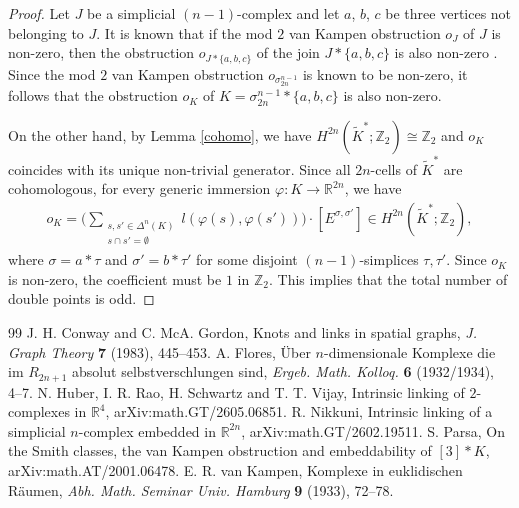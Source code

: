 \documentclass[10pt,a4paper]{amsart}
\numberwithin{equation}{section}
\begin{document}
\begin{proof}
Let $J$ be a simplicial $(n-1)$-complex and let $a$, $b$, $c$ be three vertices not belonging to $J$. It is known that if the mod $2$ van Kampen obstruction $o_J$ of $J$ is non-zero, then the obstruction $o_{J*\{a,b,c\}}$ of the join $J*\{a,b,c\}$ is also non-zero \cite{Pa20}. Since the mod $2$ van Kampen obstruction $o_{\sigma_{2n}^{n-1}}$ is known to be non-zero, it follows that the obstruction $o_K$ of $K=\sigma_{2n}^{n-1}*\{a,b,c\}$ is also non-zero. 

On the other hand, by Lemma \ref{cohomo}, we have $H^{2n}(\widetilde{K}^*;\mathbb{Z}_2)\cong\mathbb{Z}_2$ and $o_K$ coincides with its unique non-trivial generator. Since all $2n$-cells of $\widetilde{K}^*$ are cohomologous, for every generic immersion $\varphi \colon K \to \mathbb{R}^{2n}$, we have
\begin{eqnarray*}
o_K = \bigg( \sum_{\substack{s,s'\in\varDelta^{n}(K)\\ s\cap s'=\emptyset}} l(\varphi(s),\varphi(s')) \bigg) \cdot [E^{\sigma,\sigma'}] \in H^{2n}(\widetilde{K}^*;\mathbb{Z}_2),
\end{eqnarray*}
where $\sigma = a*\tau$ and $\sigma' = b*\tau'$ for some disjoint $(n-1)$-simplices $\tau,\tau'$. Since $o_K$ is non-zero, the coefficient must be $1$ in $\mathbb{Z}_2$. This implies that the total number of double points is odd.
\end{proof}


\begin{thebibliography}{99}
 J. H. Conway and C. McA. Gordon, Knots and links in spatial graphs, \textit{J. Graph Theory} {\bf 7} (1983), 445--453.
 A. Flores, \"{U}ber $n$-dimensionale Komplexe die im $R_{2n+1}$ absolut selbstverschlungen sind, \textit{Ergeb. Math. Kolloq.} {\bf 6} (1932/1934), 4--7.
 N. Huber, I. R. Rao, H. Schwartz and T. T. Vijay, Intrinsic linking of $2$-complexes in $\mathbb{R}^{4}$, arXiv:math.GT/2605.06851.
 R. Nikkuni, Intrinsic linking of a simplicial $n$-complex embedded in $\mathbb{R}^{2n}$, arXiv:math.GT/2602.19511.
 S. Parsa, On the Smith classes, the van Kampen obstruction and embeddability of $[3] * K$, arXiv:math.AT/2001.06478.
 E. R. van Kampen, Komplexe in euklidischen R\"{a}umen, \textit{Abh. Math. Seminar Univ. Hamburg} {\bf 9} (1933), 72--78.
\end{thebibliography}
\end{document}
